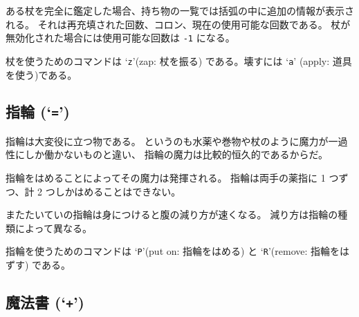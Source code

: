 ある杖を完全に鑑定した場合、持ち物の一覧では括弧の中に追加の情報が表示される。
それは再充填された回数、コロン、現在の使用可能な回数である。
杖が無効化された場合には使用可能な回数は {\tt -1} になる。

杖を使うためのコマンドは `{\tt z}'(zap: 杖を振る) である。壊すには `{\tt a}'
(apply: 道具を使う)である。

\subsection*{指輪 (`{\tt =}')}

指輪は大変役に立つ物である。
というのも水薬や巻物や杖のように魔力が一過性にしか働かないものと違い、
指輪の魔力は比較的恒久的であるからだ。

指輪をはめることによってその魔力は発揮される。
指輪は両手の薬指に 1 つずつ、計 2 つしかはめることはできない。

またたいていの指輪は身につけると腹の減り方が速くなる。
減り方は指輪の種類によって異なる。

指輪を使うためのコマンドは `{\tt P}'(put on: 指輪をはめる) と
`{\tt R}'(remove: 指輪をはずす) である。

\subsection*{魔法書 (`{\tt +}')}

